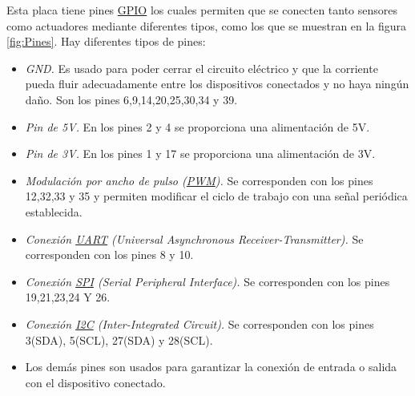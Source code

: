 Esta placa tiene pines \hyperlink{GPIO}{GPIO} los cuales permiten que se conecten tanto sensores como actuadores mediante diferentes tipos, como los que se muestran en la figura \ref{fig:Pines}. Hay diferentes tipos de pines:

\begin{itemize}
 \item \textit{GND.} Es usado para poder cerrar el circuito eléctrico y que la corriente pueda fluir adecuadamente entre los dispositivos conectados y no haya ningún daño. Son los pines 6,9,14,20,25,30,34 y 39.
 \item \textit{Pin de 5V.} En los pines 2 y 4 se proporciona una alimentación de 5V.
 \item \textit{Pin de 3V.} En los pines 1 y 17 se proporciona una alimentación de 3V.
 \item \textit{Modulación por ancho de pulso (\hyperlink{PWM}{PWM}).} Se corresponden con los pines 12,32,33 y 35 y permiten modificar el ciclo de trabajo con una señal periódica establecida.
 \item \textit{Conexión \hyperlink{UART}{UART} (Universal Asynchronous Receiver-Transmitter).} Se corresponden con los pines 8 y 10.
 \item \textit{Conexión \hyperlink{SPI}{SPI} (Serial Peripheral Interface).} Se corresponden con los pines 19,21,23,24 Y 26.
 \item \textit{Conexión \hyperlink{I2C}{I2C} (Inter-Integrated Circuit).} Se corresponden con los pines 3(SDA), 5(SCL), 27(SDA) y 28(SCL).	
 \item \textit{} Los demás pines son usados para garantizar la conexión de entrada o salida con el dispositivo conectado. 
\end{itemize}\

